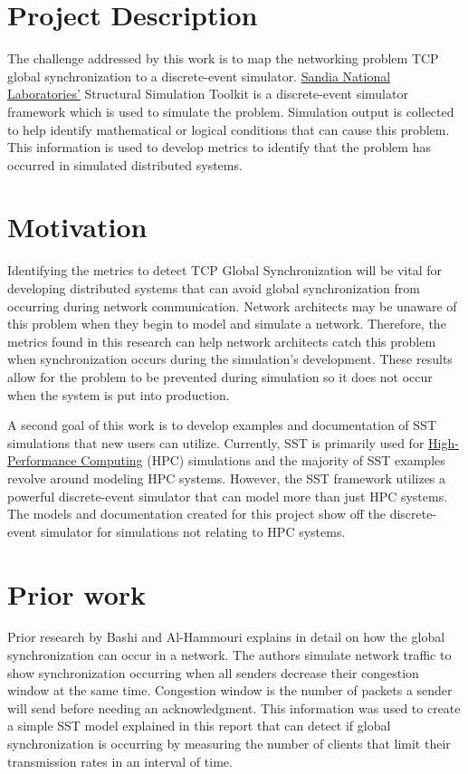 \documentclass{article}
\begin{document}
\section{Project Description} %

The challenge addressed by this work is to map the networking problem TCP global synchronization to a discrete-event simulator. \href{https://www.sandia.gov/}{Sandia National Laboratories'} Structural Simulation Toolkit is a discrete-event simulator framework which is used to simulate the problem. Simulation output is collected to help identify mathematical or logical conditions that can cause this problem. This information is used to develop metrics to identify that the problem has occurred in simulated distributed systems. 

\section{Motivation} %

Identifying the metrics to detect TCP Global Synchronization will be vital for developing distributed systems that can avoid global synchronization from occurring during network communication. Network architects may be unaware of this problem when they begin to model and simulate a network. Therefore, the metrics found in this research can help network architects catch this problem when synchronization occurs during the simulation's development. These results allow for the problem to be prevented during simulation so it does not occur when the system is put into production.

A second goal of this work is to develop examples and documentation of SST simulations that new users can utilize. Currently, SST is primarily used for \href{https://en.wikipedia.org/wiki/High-performance_computing}{High-Performance Computing} (HPC) simulations and the majority of SST examples revolve around modeling HPC systems. However, the SST framework utilizes a powerful discrete-event simulator that can model more than just HPC systems. The models and documentation created for this project show off the discrete-event simulator for simulations not relating to HPC systems.

\section{Prior work} %
Prior research by Bashi and Al-Hammouri \cite{Bashi2017} explains in detail on how the global synchronization can occur in a network. The authors simulate network traffic to show synchronization occurring when all senders decrease their congestion window at the same time. Congestion window is the number of packets a sender will send before needing an acknowledgment. This information was used to create a simple SST model explained in this report that can detect if global synchronization is occurring by measuring the number of clients that limit their transmission rates in an interval of time.
\end{document}
